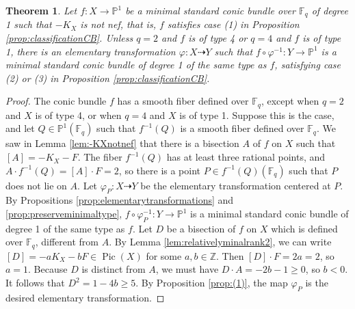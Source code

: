 \documentclass[a4paper, 11pt, reqno]{amsart}
\numberwithin{equation}{section} \numberwithin{figure}{section}
\DeclareMathOperator{\Pic}{Pic}
\def \F {{\mathbb F}}
\def \P {{\mathbb P}}
\def \Z {{\mathbb Z}}
\newcommand{\ra}{\rightarrow}
\newtheorem{theorem}[lemma]{Theorem}
\theoremstyle{definition}
\numberwithin{lemma}{section}
\begin{document}
\begin{theorem}\label{thm:(1)to(2,3)}
    Let $f \colon X \ra \P^1$ be a minimal standard conic bundle over $\F_q$ of degree 1 such that $-K_X$ is not nef, that is, $f$ satisfies case (1) in Proposition \ref{prop:classificationCB}. Unless $q = 2$ and $f$ is of type 4 or $q = 4$ and $f$ is of type 1, there is an elementary transformation $\varphi \colon X \dashrightarrow Y$ such that $f \circ \varphi^{-1} \colon Y \ra \P^1$ is a minimal standard conic bundle of degree 1 of the same type as $f$, satisfying case (2) or (3) in Proposition \ref{prop:classificationCB}.
\end{theorem}

\begin{proof}
    The conic bundle $f$ has a smooth fiber defined over $\F_q$, except when $q = 2$ and $X$ is of type 4, or when $q = 4$ and $X$ is of type 1. Suppose this is the case, and let $Q \in \P^1(\F_q)$ such that $f^{-1}(Q)$ is a smooth fiber defined over $\F_q$. We saw in Lemma \ref{lem:-KXnotnef} that there is a bisection $A$ of $f$ on $X$ such that $[A] = -K_X-F$. The fiber $f^{-1}(Q)$ has at least three rational points, and $A \cdot f^{-1}(Q) = [A] \cdot F = 2$, so there is a point $P \in f^{-1}(Q)(\F_q)$ such that $P$ does not lie on $A$. Let $\varphi_{\scriptscriptstyle P} \colon X \dashrightarrow Y$ be the elementary transformation centered at $P$. By Propositions \ref{prop:elementarytransformations} and \ref{prop:preserveminimaltype}, $f \circ \varphi_{\scriptscriptstyle P}^{-1} \colon Y \ra \P^1$ is a minimal standard conic bundle of degree 1 of the same type as $f$. Let $D$ be a bisection of $f$ on $X$ which is defined over $\F_q$, different from $A$. By Lemma \ref{lem:relativelyminalrank2}, we can write $[D] = -a K_X - bF \in \Pic(X)$ for some $a, b \in \Z$. Then $[D] \cdot F = 2a = 2$, so $a = 1$. Because $D$ is distinct from $A$, we must have $D \cdot A = -2b-1 \geq 0$, so $b < 0$. It follows that $D^2 = 1 - 4b \geq 5$. By Proposition \ref{prop:(1)}, the map $\varphi_{\scriptscriptstyle P}$ is the desired elementary transformation.
\end{proof}
\end{document}
